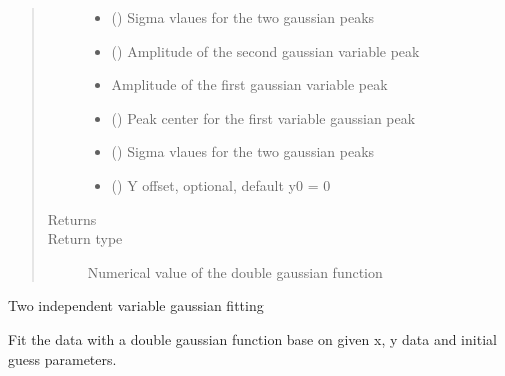 \documentclass[letterpaper,10pt,english]{sphinxmanual}
\begin{document}
\begin{fulllineitems}
\begin{fulllineitems}
\begin{quote}
\begin{description}
\begin{itemize}
\item {} 
 () \textendash{} Sigma vlaues for the two gaussian peaks

\item {} 
 () \textendash{} Amplitude of the second gaussian variable peak

\item {} 
 \textendash{} Amplitude of the first gaussian variable peak

\item {} 
 () \textendash{} Peak center for the first variable gaussian peak

\item {} 
 () \textendash{} Sigma vlaues for the two gaussian peaks

\item {} 
 () \textendash{} Y offset, optional, default y0 = 0

\end{itemize}

\item[{Returns}] \leavevmode


\item[{Return type}] \leavevmode
Numerical value of the double gaussian function

\end{description}\end{quote}

\end{fulllineitems}


\begin{fulllineitems}
\label{\detokenize{scibeam.core:scibeam.core.gaussian.Gaussian.doubleGausFit}}
Two independent variable gaussian fitting

Fit the data with a double gaussian function base on given
x, y data and initial guess parameters.


\end{fulllineitems}
\end{fulllineitems}
\end{document}
